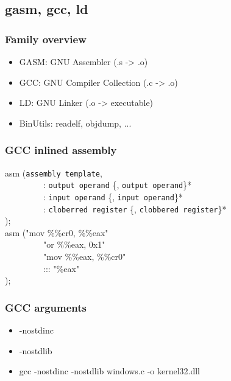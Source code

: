 \documentclass{beamer}
\begin{document}
\subsection{gasm, gcc, ld}

\begin{frame}
  \frametitle{Family overview}

  \begin{itemize}
  \item
    GASM: GNU Assembler (.s -> .o)
  \item
    GCC: GNU Compiler Collection (.c -> .o)
  \item
    LD: GNU Linker (.o -> executable)
  \item
    BinUtils: readelf, objdump, ...
  \end{itemize}
\end{frame}

\begin{frame}
  \frametitle{GCC inlined assembly}

  asm (\texttt{assembly template},\\
  \ \ \ \ \ \ \ \ \ : \texttt{output operand} \{, \texttt{output operand}\}*\\
  \ \ \ \ \ \ \ \ \ : \texttt{input operand} \{, \texttt{input operand}\}*\\
  \ \ \ \ \ \ \ \ \ : \texttt{cloberred register} \{, \texttt{clobbered register}\}*\\
  );\\
  \vspace{10pt}
  asm ("mov \%\%cr0, \%\%eax"\\
  \ \ \ \ \ \ \ \ \ "or  \%\%eax, 0x1"\\
  \ \ \ \ \ \ \ \ \ "mov \%\%eax, \%\%cr0"\\
  \ \ \ \ \ \ \ \ \ ::: "\%eax"\\
  );
\end{frame}

\begin{frame}
  \frametitle{GCC arguments}

  \begin{itemize}
  \item
    -nostdinc
  \item
    -nostdlib
  \end{itemize}
  \begin{itemize}
  \item
    gcc -nostdinc -nostdlib windows.c -o kernel32.dll
  \end{itemize}
\end{frame}
\end{document}
